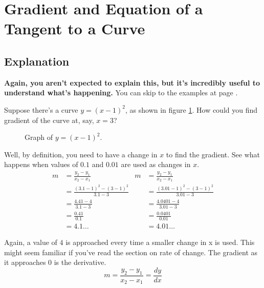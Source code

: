 \section{Gradient and Equation of a Tangent to a Curve}
\subsection{Explanation}
\textbf{Again, you aren't expected to explain this, but it's incredibly useful to understand what's happening.} You can skip to the examples at page \pageref{sec:derivativeExamples}.

Suppose there's a curve $y=(x-1)^2$, as shown in figure \ref{fig:gradientBasicExample}. How could you find gradient of the curve at, say, $x=3$?

\begin{figure}[h!]
	\centering
	\caption{Graph of $y=(x-1)^2$.}
	\label{fig:gradientBasicExample}
\end{figure}

Well, by definition, you need to have a change in $x$ to find the gradient. See what happens when values of $0.1$ and $0.01$ are used as changes in $x$.
\begin{align*}
	m &= \frac{y_2 - y_1}{x_2 - x_1} & m &= \frac{y_2 - y_1}{x_2 - x_1}\\
	&= \frac{(3.1-1)^2 - (3-1)^2}{3.1-3} & &= \frac{(3.01-1)^2 - (3-1)^2}{3.01-3}\\
	&= \frac{4.41 - 4}{3.1-3} & &= \frac{4.0401 - 4}{3.01-3}\\
	&= \frac{0.41}{0.1} & &= \frac{0.0401}{0.01}\\
	&= 4.1\dots & &= 4.01\dots
\end{align*}

Again, a value of $4$ is approached every time a smaller change in x is used. This might seem familiar if you've read the section on rate of change. The gradient as it approaches $0$ is the derivative.
\begin{equation*}
	m = \frac{y_2 - y_1}{x_2 - x_1} = \frac{dy}{dx}
\end{equation*}

